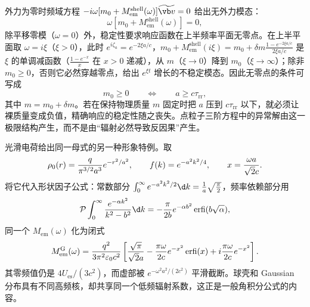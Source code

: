 外力为零时频域方程 $-i\omega[m_0+M_{\mathrm{em}}^{\mathrm{shell}}(\omega)]\widetilde{\vb v}=0$ 给出无外力模态：
\begin{equation*}
 \omega\left[m_0+M_{\mathrm{em}}^{\mathrm{shell}}(\omega)\right]=0,
\end{equation*}
除平移零模（$\omega=0$）外，稳定性要求响应函数在上半频率平面无零点。在上半平面取 $\omega=i\xi$（$\xi>0$），此时 $e^{i\zeta_a}=e^{-2\xi a/c}$，$m_0+M_{\mathrm{em}}^{\mathrm{shell}}(i\xi)=m_0+\delta m\frac{1-e^{-2\xi a/c}}{2\xi a/c}$ 是 $\xi$ 的单调减函数（$\frac{1-e^{-x}}{x}$ 在 $x>0$ 递减），从 $m$（$\xi\to0$）降到 $m_0$（$\xi\to\infty$）；除非 $m_0\geq0$，否则它必然穿越零点，给出 $e^{\xi t}$ 增长的不稳定模态。因此无零点的条件可写成
\begin{equation*}
 m_0\geq0
 \qquad\Longleftrightarrow\qquad
 a\geq c\tau_{\mathrm{rr}},
\end{equation*}
其中 $m=m_0+\delta m$。若在保持物理质量 $m$ 固定时把 $a$ 压到 $c\tau_{\mathrm{rr}}$ 以下，就必须让裸质量变成负值，精确响应的稳定性随之丧失。点粒子三阶方程中的异常解由这一极限结构产生，而不是由“辐射必然导致反因果”产生。

光滑电荷给出同一母式的另一种形象特例。取
\begin{equation*}
 \rho_0(r)={q\over\pi^{3/2}a^3}e^{-r^2/a^2},
 \qquad
 f(k)=e^{-a^2k^2/4},
 \qquad
 x={\omega a\over\sqrt2c}.
\end{equation*}
将它代入形状因子公式：常数部分 $\int_0^\infty e^{-a^2k^2/2}\d k=\frac1a\sqrt{\frac\pi2}$，频率依赖部分用
\begin{equation*}
 \mathcal P\int_0^\infty{e^{-\alpha k^2}\over k^2-b^2}\d k
 =-{\pi\over2b}e^{-\alpha b^2}\operatorname{erfi}(b\sqrt\alpha),
\end{equation*}
同一个 $M_{\mathrm{em}}(\omega)$ 化为闭式
\begin{equation*}
 M_{\mathrm{em}}^{\mathrm G}(\omega)
 ={q^2\over3\pi^2\varepsilon_0c^2}
 \left[
 {\sqrt\pi\over\sqrt2a}
 -{\pi\omega\over2c}e^{-x^2}\operatorname{erfi}(x)
 +i{\pi\omega\over2c}e^{-x^2}
 \right].
\end{equation*}
其零频值仍是 $4U_{\mathrm{es}}/(3c^2)$，而虚部被 $e^{-\omega^2a^2/(2c^2)}$ 平滑截断。球壳和 Gaussian 分布具有不同高频核，却共享同一个低频辐射系数，这正是一般角积分公式的内容。

